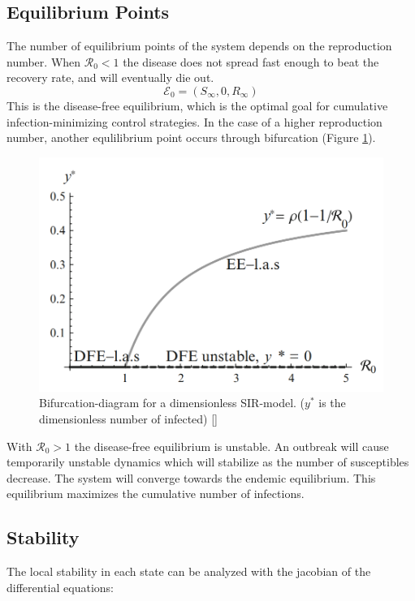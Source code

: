 \subsection{Equilibrium Points}
The number of equilibrium points of the system depends on the reproduction number. When $\mathscr{R}_0 < 1$ the disease does not spread fast enough to beat the recovery rate, and will eventually die out. 
\begin{equation}
    \mathscr{E}_0 = (S_\infty, 0, R_\infty)
\end{equation}
This is the disease-free equilibrium, which is the optimal goal for cumulative infection-minimizing control strategies. In the case of a higher reproduction number, another equlilibrium point occurs through bifurcation (Figure \ref{fig:Forward_Bifurcation}). 
\begin{figure}[h]
    \centering
    \includegraphics[width = .6\textwidth]{Figures/Bifurkasjonsdiagram_SIR.PNG}
    \caption{Bifurcation-diagram for a dimensionless SIR-model. 
    ($y^*$ is the dimensionless number of infected) [\cite{Martcheva}]}
    \label{fig:Forward_Bifurcation}
\end{figure}

With $\mathscr{R}_0 > 1$ the disease-free equilibrium is unstable. An outbreak will cause temporarily unstable dynamics which will stabilize as the number of susceptibles decrease. The system will converge towards the endemic equilibrium. This equilibrium maximizes the cumulative number of infections.
\subsection{Stability}
\label{ch:SIR_stability}
The local stability in each state can be analyzed with the jacobian of the differential equations:

